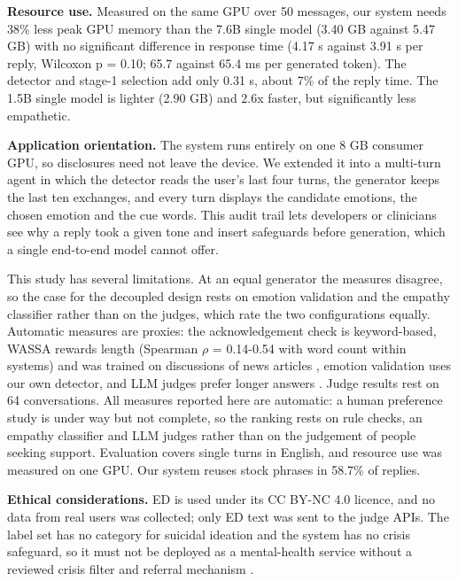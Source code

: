 \documentclass[conference,a4paper]{IEEEtran}
\begin{document}
\textbf{Resource use.} Measured on the same GPU over 50 messages, our system needs 38\% less peak GPU memory than the 7.6B single model (3.40 GB against 5.47 GB) with no significant difference in response time (4.17 s against 3.91 s per reply, Wilcoxon p = 0.10; 65.7 against 65.4 ms per generated token). The detector and stage-1 selection add only 0.31 s, about 7\% of the reply time. The 1.5B single model is lighter (2.90 GB) and 2.6x faster, but significantly less empathetic.

\textbf{Application orientation.} The system runs entirely on one 8 GB consumer GPU, so disclosures need not leave the device. We extended it into a multi-turn agent in which the detector reads the user's last four turns, the generator keeps the last ten exchanges, and every turn displays the candidate emotions, the chosen emotion and the cue words. This audit trail lets developers or clinicians see why a reply took a given tone and insert safeguards before generation, which a single end-to-end model cannot offer.

This study has several limitations. At an equal generator the measures disagree, so the case for the decoupled design rests on emotion validation and the empathy classifier rather than on the judges, which rate the two configurations equally. Automatic measures are proxies: the acknowledgement check is keyword-based, WASSA rewards length (Spearman $\rho$ = 0.14-0.54 with word count within systems) and was trained on discussions of news articles \cite{b17}, emotion validation uses our own detector, and LLM judges prefer longer answers \cite{b14}. Judge results rest on 64 conversations. All measures reported here are automatic: a human preference study is under way but not complete, so the ranking rests on rule checks, an empathy classifier and LLM judges rather than on the judgement of people seeking support. Evaluation covers single turns in English, and resource use was measured on one GPU. Our system reuses stock phrases in 58.7\% of replies.

\textbf{Ethical considerations.} ED is used under its CC BY-NC 4.0 licence, and no data from real users was collected; only ED text was sent to the judge APIs. The label set has no category for suicidal ideation and the system has no crisis safeguard, so it must not be deployed as a mental-health service without a reviewed crisis filter and referral mechanism \cite{b35}.
\end{document}

